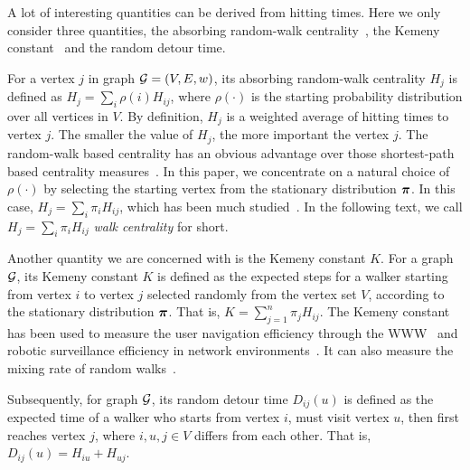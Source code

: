 \documentclass[journal]{IEEEtran}
\begin{document}
A lot of interesting quantities can be derived from hitting times. Here we only consider three quantities, the absorbing random-walk centrality~\cite{MaMagi15}, the Kemeny constant~\cite{Hu14} and the random detour time.

For a vertex \(j\) in graph \(\mathcal{G}=(V,E,w)\), its absorbing random-walk centrality \(H_j\) is defined as \(H_j=\sum_{i} \rho(i) H_{ij}\), where \(\rho(\cdot)\) is the starting probability distribution over all vertices in \(V\). By definition, \(H_j\) is a weighted average of hitting times to vertex \(j\). The smaller the value of \(H_j\), the more important the vertex \(j\). The random-walk based centrality has an obvious advantage over those shortest-path based centrality measures~\cite{Ne05}. In this paper, we concentrate on a natural choice of  \(\rho(\cdot)\) by selecting the starting vertex from the stationary distribution \(\boldsymbol{\pi}\). In this case, \(H_j=\sum_{i} \pi_i H_{ij}\), which has been much studied~\cite{TeBeVo09,Be09,Be16}. In the following text, we  call \(H_j=\sum_{i} \pi_i H_{ij}\) \textit{walk centrality} for short.

Another quantity we are concerned with is the Kemeny constant \(K\). For a graph \(\mathcal{G}\), its Kemeny constant \(K\) is defined as the expected steps for a walker starting from  vertex \(i\) to vertex \(j\) selected randomly from the vertex set \(V\), according to the stationary distribution \(\boldsymbol{\pi}\). That is, \(K = \sum_{j = 1}^{n} \pi_j H_{ij}\). The Kemeny constant has been used to measure the user navigation efficiency through the WWW~\cite{LeLo02} and  robotic surveillance efficiency in network environments~\cite{PaAgBu15}. It can also measure the mixing rate of random walks~\cite{LePeWi09}.

Subsequently, for graph \(\mathcal{G}\), its random detour time \(D_{ij}(u)\) is defined as the expected time of a walker who starts from vertex \(i\), must visit vertex \(u\), then first reaches vertex \(j\), where \(i,u,j\in V\) differs from each other.
That is, \(D_{ij}(u)= H_{iu}+H_{uj}\).
\end{document}
